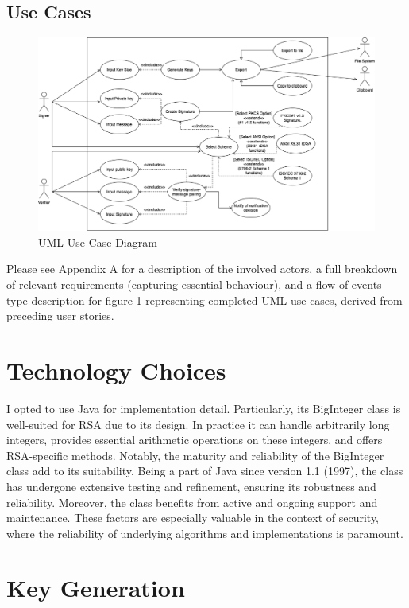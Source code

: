 \documentclass[]{final_report}
\theoremstyle{definition}
\begin{document}
\subsection{Use Cases}
\begin{figure}[H]
    \centering
    \includegraphics[scale=0.48]{POC_USE-CASE.png}
    \caption{UML Use Case Diagram}
    \label{fig:uc}
\end{figure}

Please see Appendix A for a description of the involved actors, a full breakdown of relevant requirements (capturing essential behaviour), and a flow-of-events type description for figure \ref{fig:uc} representing completed UML use cases, derived from preceding user stories.

\section{Technology Choices}
I opted to use Java for implementation detail. Particularly, its BigInteger class is well-suited for RSA due to its design. In practice it can handle arbitrarily long integers, provides essential arithmetic operations on these integers, and offers RSA-specific methods. Notably, the maturity and reliability of the BigInteger class add to its suitability. Being a part of Java since version 1.1 (1997), the class has undergone extensive testing and refinement, ensuring its robustness and reliability. Moreover, the class benefits from active and ongoing support and maintenance. These factors are especially valuable in the context of security, where the reliability of underlying algorithms and implementations is paramount.

\section{Key Generation}
\end{document}

